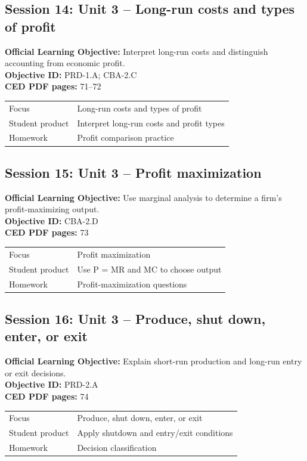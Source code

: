 \documentclass[11pt,a4paper]{article}
\newcommand{\objectivebox}[1]{\noindent\colorbox{aplight}{\parbox{0.96\textwidth}{#1}}}
\begin{document}
\subsection{Session 14: Unit 3 -- Long-run costs and types of profit}
\objectivebox{\textbf{Official Learning Objective:} Interpret long-run costs and distinguish accounting from economic profit.\\\textbf{Objective ID:} PRD-1.A; CBA-2.C\\\textbf{CED PDF pages:} 71–72}\par\vspace{0.4em}
\begin{tabularx}{\textwidth}{p{3.0cm}Y}
\toprule
Focus & Long-run costs and types of profit\\
Student product & Interpret long-run costs and profit types\\
Homework & Profit comparison practice\\
\bottomrule
\end{tabularx}
\subsection{Session 15: Unit 3 -- Profit maximization}
\objectivebox{\textbf{Official Learning Objective:} Use marginal analysis to determine a firm’s profit-maximizing output.\\\textbf{Objective ID:} CBA-2.D\\\textbf{CED PDF pages:} 73}\par\vspace{0.4em}
\begin{tabularx}{\textwidth}{p{3.0cm}Y}
\toprule
Focus & Profit maximization\\
Student product & Use P = MR and MC to choose output\\
Homework & Profit-maximization questions\\
\bottomrule
\end{tabularx}
\subsection{Session 16: Unit 3 -- Produce, shut down, enter, or exit}
\objectivebox{\textbf{Official Learning Objective:} Explain short-run production and long-run entry or exit decisions.\\\textbf{Objective ID:} PRD-2.A\\\textbf{CED PDF pages:} 74}\par\vspace{0.4em}
\begin{tabularx}{\textwidth}{p{3.0cm}Y}
\toprule
Focus & Produce, shut down, enter, or exit\\
Student product & Apply shutdown and entry/exit conditions\\
Homework & Decision classification\\
\bottomrule
\end{tabularx}
\end{document}
